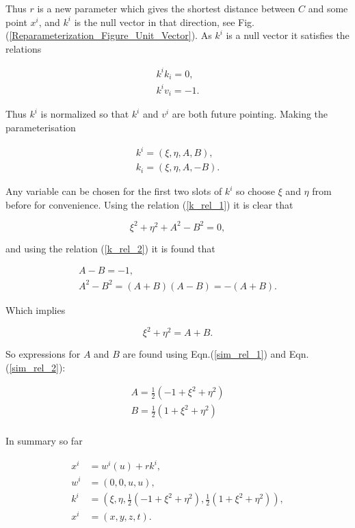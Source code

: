 \noindent Thus $r$ is a new parameter which gives the shortest distance between $C$ and some point $x^i$, and $k^i$ is the null vector in that direction, see Fig.(\ref{Reparameterization_Figure_Unit_Vector}). As $k^i$ is a null vector it satisfies the relations

\begin{gather}
k^i k_i = 0 \label{k_rel_1},\\
k^i v_i = -1 \label{k_rel_2}.
\end{gather}

\noindent Thus $k^i$ is normalized so that $k^i$ and $v^i$ are both future pointing. Making the parameterisation

\begin{gather*}
k^i = (\xi, \eta, A, B), \\
k_i = (\xi, \eta, A, -B).
\end{gather*}

\noindent Any variable can be chosen for the first two slots of $k^i$ so choose $\xi$ and $\eta$ from before for convenience. Using the relation (\ref{k_rel_1}) it is clear that

\begin{equation*}
\xi^2 + \eta^2 + A^2 - B^2 = 0,
\end{equation*}

\noindent and using the relation (\ref{k_rel_2}) it is found that

\begin{gather}
A - B = -1 \label{sim_rel_1},\\
A^2 - B^2 = (A + B)(A - B) = - (A + B).
\end{gather}

\noindent Which implies

\begin{equation}\label{sim_rel_2}
\xi^2 + \eta^2 = A + B. 
\end{equation}

\noindent So expressions for $A$ and $B$ are found using Eqn.(\ref{sim_rel_1}) and Eqn.(\ref{sim_rel_2}):

\begin{eqnarray*}
A = \frac{1}{2} (-1 + \xi^2 + \eta^2) \\
B = \frac{1}{2} (1 + \xi^2 + \eta^2) \\
\end{eqnarray*}

In summary so far

\begin{align}
x^i & = w^i (u) + r k^i \label{rel_for_trans_1},\\
w^i & = (0,0, u,u) \label{rel_for_trans_2},\\
k^i & = (\xi, \eta, \frac{1}{2} (-1 + \xi^2 + \eta^2), \frac{1}{2} (1 + \xi^2 + \eta^2)) \label{rel_for_trans_3},\\
x^i & = (x, y, z, t) \label{rel_for_trans_4}.  
\end{align}

